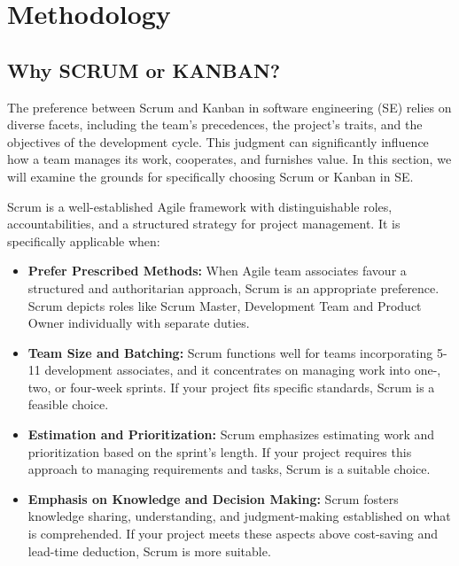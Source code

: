\documentclass[conference]{IEEEtran}
\begin{document}
\section{Methodology}

\subsection{Why SCRUM or KANBAN?}

The preference between Scrum and Kanban in software engineering (SE) relies on diverse facets, including the team's precedences, the project's traits, and the objectives of the development cycle. This judgment can significantly influence how a team manages its work, cooperates, and furnishes value. In this section, we will examine the grounds for specifically choosing Scrum or Kanban in SE.\cite{kniberg2010kanban}

Scrum is a well-established Agile framework with distinguishable roles, accountabilities, and a structured strategy for project management. It is specifically applicable when:\cite{kniberg2010kanban}

\begin{itemize}
\item \textbf{Prefer Prescribed Methods:} When Agile team associates favour a structured and authoritarian approach, Scrum is an appropriate preference. Scrum depicts roles like Scrum Master, Development Team and Product Owner individually with separate duties\cite{s1-alqudah2018empirical}\cite{kniberg2010kanban}.

\item \textbf{Team Size and Batching:} Scrum functions well for teams incorporating 5-11 development associates, and it concentrates on managing work into one-, two, or four-week sprints. If your project fits specific standards, Scrum is a feasible choice\cite{s1-alqudah2018empirical}\cite{mahnivc2015scrum}.

\item \textbf{Estimation and Prioritization:} Scrum emphasizes estimating work and prioritization based on the sprint's length. If your project requires this approach to managing requirements and tasks, Scrum is a suitable choice\cite{s1-alqudah2018empirical}.

\item \textbf{Emphasis on Knowledge and Decision Making:} Scrum fosters knowledge sharing, understanding, and judgment-making established on what is comprehended. If your project meets these aspects above cost-saving and lead-time deduction, Scrum is more suitable\cite{s1-alqudah2018empirical}\cite{mahnivc2015scrum}.
\end{itemize}
\end{document}
